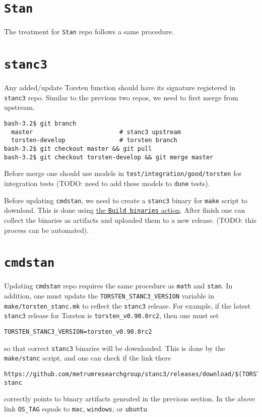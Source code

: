 \documentclass[12pt, reqno, oneside]{amsbook}
\numberwithin{equation}{chapter}
\numberwithin{figure}{chapter}
\numberwithin{table}{chapter}
\theoremstyle{remark}
\begin{document}
\section{\texttt{Stan}}
\label{sec:orgaac0db9}
The treatment for \texttt{Stan} repo follows a same procedure. 

\section{\texttt{stanc3}}
\label{sec:orgb6072a8}
Any added/update Torsten function should have its signature registered
in \texttt{stanc3} repo. Similar to the previous two repos, we need to first
merge from upstream.
\begin{verbatim}
bash-3.2$ git branch
  master                        # stanc3 upstream 
  torsten-develop               # torsten branch
bash-3.2$ git checkout master && git pull
bash-3.2$ git checkout torsten-develop && git merge master
\end{verbatim}
Before merge one should use models in \texttt{test/integration/good/torsten}
for integration tests (TODO: need to add these models to \texttt{dune} tests).

Before updating \texttt{cmdstan}, we need to create a \texttt{stanc3} binary for
\texttt{make} script to download. This is done using \href{https://github.com/metrumresearchgroup/stanc3/actions}{the \texttt{Build binaries}
action}. After finish one can collect the binaries as artifacts and
uploaded them to a new release. (TODO: this process can be automated).


\section{\texttt{cmdstan}}
\label{sec:orgb3dd27a}
Updating \texttt{cmdstan} repo requires the same procedure as \texttt{math} and
\texttt{stan}. In addition, one must update the \texttt{TORSTEN\_STANC3\_VERSION}
variable in \texttt{make/torsten\_stanc.mk} to reflect the \texttt{stanc3}
release. For example, if the latest \texttt{stanc3} release for Torsten is
\texttt{torsten\_v0.90.0rc2}, then one must set
\begin{verbatim}
TORSTEN_STANC3_VERSION=torsten_v0.90.0rc2
\end{verbatim}
so that correct \texttt{stanc3} binaries will be downloaded. This is done by
the \texttt{make/stanc} script, and one can check if the link there
\begin{verbatim}
https://github.com/metrumresearchgroup/stanc3/releases/download/$(TORSTEN_STANC3_VERSION)/$(OS_TAG)-stanc
\end{verbatim}
correctly points to binary artifacts geneated in the previous
section. In the above link \texttt{OS\_TAG} equals to \texttt{mac}, \texttt{windows}, or
\texttt{ubuntu}.
\end{document}
